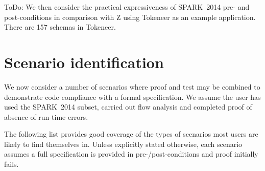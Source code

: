 \documentclass{llncs} \usepackage[utf8]{inputenc} \usepackage{url}
\newcommand{\newspark}{SPARK~2014\xspace}
\begin{document}
ToDo: We then consider the practical expressiveness of \newspark pre-
and post-conditions in comparison with Z using Tokeneer as an example
application. There are 157 schemas in Tokeneer.


\section{Scenario identification}

We now consider a number of scenarios where proof and test may be
combined to demonstrate code compliance with a formal
specification. We assume the user has used the \newspark subset,
carried out flow analysis and completed proof of absence of run-time
errors.

The following list provides good coverage of the types of scenarios
most users are likely to find themselves in. Unless explicitly stated
otherwise, each scenario assumes a full specification is provided in
pre-/post-conditions and proof initially fails.
\end{document}
